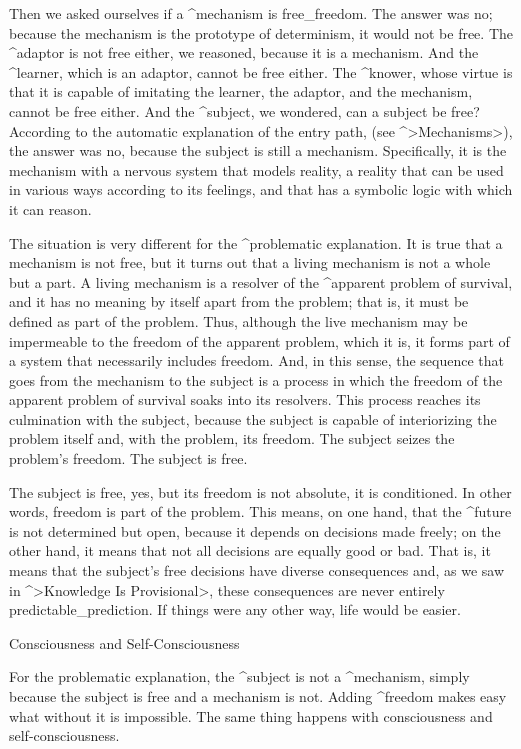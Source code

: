 Then we asked ourselves if a ^{mechanism} is free_{freedom}. The answer
was no; because the mechanism is the prototype of determinism, it would
not be free. The ^{adaptor} is not free either, we reasoned, because it
is a mechanism. And the ^{learner}, which is an adaptor, cannot be free
either. The ^{knower}, whose virtue is that it is capable of imitating
the learner, the adaptor, and the mechanism, cannot be free either. And
the ^{subject}, we wondered, can a subject be free? According to the
automatic explanation of the entry path, (see ^>Mechanisms>), the answer
was no, because the subject is still a mechanism. Specifically, it is
the mechanism with a nervous system that models reality, a reality that
can be used in various ways according to its feelings, and that has a
symbolic logic with which it can reason.

The situation is very different for the ^{problematic explanation}. It
is true that a mechanism is not free, but it turns out that a living
mechanism is not a whole but a part. A living mechanism is a resolver of
the ^{apparent problem} of survival, and it has no meaning by itself
apart from the problem; that is, it must be defined as part of the
problem. Thus, although the live mechanism may be impermeable to the
freedom of the apparent problem, which it is, it forms part of a system
that necessarily includes freedom. And, in this sense, the sequence that
goes from the mechanism to the subject is a process in which the freedom
of the apparent problem of survival soaks into its resolvers. This
process reaches its culmination with the subject, because the subject is
capable of interiorizing the problem itself and, with the problem, its
freedom. The subject seizes the problem's freedom. The subject is free.

The subject is free, yes, but its freedom is not absolute, it is
conditioned. In other words, freedom is part of the problem. This means,
on one hand, that the ^{future} is not determined but open, because it
depends on decisions made freely; on the other hand, it means that not
all decisions are equally good or bad. That is, it means that the
subject's free decisions have diverse consequences and, as we saw in
^>Knowledge Is Provisional>, these consequences are never entirely
predictable_{prediction}. If things were any other way, life would be
easier.


\Section Consciousness and Self-Consciousness

For the problematic explanation, the ^{subject} is not a ^{mechanism},
simply because the subject is free and a mechanism is not. Adding
^{freedom} makes easy what without it is impossible. The same thing
happens with consciousness and self-consciousness.

